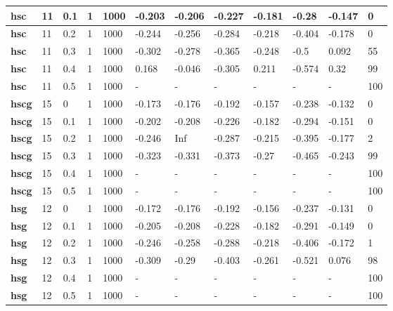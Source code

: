 \begin{longtable}[h]{|p{0.8cm}|p{1.5cm}|p{1cm}|p{1cm}|p{1cm}|p{1cm}|p{1cm}|p{1cm}|p{1cm}|p{1cm}|p{1cm}|p{1.5cm}|}
    \\ \hline
  \textbf{hsc } &  11         & 0.1 & 1 & 1000 & -0.203 & -0.206 & -0.227 & -0.181 &  -0.28 & -0.147 &   0
    \\ \hline
  \textbf{hsc } &  11         & 0.2 & 1 & 1000 & -0.244 & -0.256 & -0.284 & -0.218 & -0.404 & -0.178 &   0
    \\ \hline
  \textbf{hsc } &  11         & 0.3 & 1 & 1000 & -0.302 & -0.278 & -0.365 & -0.248 &   -0.5 &  0.092 &  55
    \\ \hline
  \textbf{hsc } &  11         & 0.4 & 1 & 1000 &  0.168 & -0.046 & -0.305 &  0.211 & -0.574 &   0.32 &  99
    \\ \hline
  \textbf{hsc } &  11         & 0.5 & 1 & 1000 & - & - & - & - & - & - & 100
    \\ \hline
  \textbf{hscg} &  15         &   0 & 1 & 1000 & -0.173 & -0.176 & -0.192 & -0.157 & -0.238 & -0.132 &   0
    \\ \hline
  \textbf{hscg} &  15         & 0.1 & 1 & 1000 & -0.202 & -0.208 & -0.226 & -0.182 & -0.294 & -0.151 &   0
    \\ \hline
  \textbf{hscg} &  15         & 0.2 & 1 & 1000 & -0.246 &    Inf & -0.287 & -0.215 & -0.395 & -0.177 &   2
    \\ \hline
  \textbf{hscg} &  15         & 0.3 & 1 & 1000 & -0.323 & -0.331 & -0.373 &  -0.27 & -0.465 & -0.243 &  99
    \\ \hline
  \textbf{hscg} &  15         & 0.4 & 1 & 1000 & - & - & - & - & - & - & 100
    \\ \hline
  \textbf{hscg} &  15         & 0.5 & 1 & 1000 & - & - & - & - & - & - & 100
    \\ \hline
  \textbf{hsg } &  12         &   0 & 1 & 1000 & -0.172 & -0.176 & -0.192 & -0.156 & -0.237 & -0.131 &   0
    \\ \hline
  \textbf{hsg } &  12         & 0.1 & 1 & 1000 & -0.205 & -0.208 & -0.228 & -0.182 & -0.291 & -0.149 &   0
    \\ \hline
  \textbf{hsg } &  12         & 0.2 & 1 & 1000 & -0.246 & -0.258 & -0.288 & -0.218 & -0.406 & -0.172 &   1
    \\ \hline
  \textbf{hsg } &  12         & 0.3 & 1 & 1000 & -0.309 &  -0.29 & -0.403 & -0.261 & -0.521 &  0.076 &  98
    \\ \hline
  \textbf{hsg } &  12         & 0.4 & 1 & 1000 & - & - & - & - & - & - & 100
    \\ \hline
  \textbf{hsg } &  12         & 0.5 & 1 & 1000 & - & - & - & - & - & - & 100
    \\ \hline
 \end{longtable}
